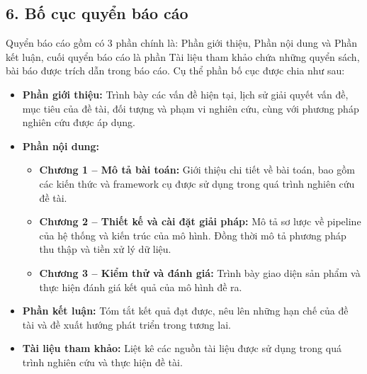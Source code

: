 \subsection{6. Bố cục quyển báo cáo}
\indent\indent Quyển báo cáo gồm có 3 phần chính là: Phần giới thiệu, Phần nội dung và Phần kết luận, cuối quyển báo cáo là phần Tài liệu tham khảo chứa những quyển sách, bài báo được trích dẫn trong báo cáo. Cụ thể phần bố cục được chia như sau:\vspace{-0.1cm}
\begin{itemize}[label={--}, itemsep=1pt]
    \item \textbf{Phần giới thiệu:} Trình bày các vấn đề hiện tại, lịch sử giải quyết vấn đề, mục tiêu của đề tài, đối tượng và phạm vi nghiên cứu, cùng với phương pháp nghiên cứu được áp dụng.
    \item \textbf{Phần nội dung:}\vspace{-0.1cm} 
    \begin{itemize}[label={+}, itemsep=1pt]
        \item \textbf{Chương 1 -- Mô tả bài toán:} Giới thiệu chi tiết về bài toán, bao gồm các kiến thức và framework cụ được sử dụng trong quá trình nghiên cứu đề tài.
        \item \textbf{Chương 2 -- Thiết kế và cài đặt giải pháp:} Mô tả sơ lược về pipeline của hệ thống và kiến trúc của mô hình. Đồng thời mô tả phương pháp thu thập và tiền xử lý dữ liệu.
        \item \textbf{Chương 3 -- Kiểm thử và đánh giá:} Trình bày giao diện sản phẩm và thực hiện đánh giá kết quả của mô hình đề ra.
    \end{itemize}
    \item \textbf{Phần kết luận:} Tóm tắt kết quả đạt được, nêu lên những hạn chế của đề tài và đề xuất hướng phát triển trong tương lai.
    \item \textbf{Tài liệu tham khảo:} Liệt kê các nguồn tài liệu được sử dụng trong quá trình nghiên cứu và thực hiện đề tài.
\end{itemize}